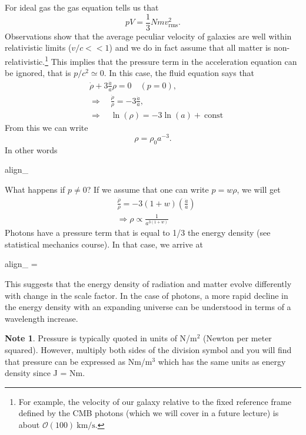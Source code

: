 \documentclass[a4paper,12pt]{article}
\newcommand{\boxedeq}[2]{\begin{empheq}[box={\fboxsep=6pt\fbox}]{align}\label{#1}#2\end{empheq}}
\theoremstyle{remark}
\newcommand{\mrm}[1]{\mathrm{#1}}
\renewcommand{\=}[1]{\stackrel{#1}{=}} %
\theoremstyle{plain}
\theoremstyle{definition}
\newtheorem*{definitionT}{Note}%
\newenvironment{note}{
\begin{dBox}
\begin{definitionT}}
{\end{definitionT}
\end{dBox}}
\begin{document}
For ideal gas the gas equation tells us that 
\begin{equation}
pV = \frac{1}{3}N m v^{2}_\mrm{rms}.
\end{equation}
Observations show that the average peculiar velocity of galaxies are well within relativistic limits ($v/c << 1$) and we do in fact assume that all matter is non-relativistic.\footnote{For example, the velocity of our galaxy relative to the fixed reference frame defined by the CMB photons (which we will cover in a future lecture) is about $\mathcal{O}(100) \:\mrm{km/s}$.} This implies that the pressure term in the acceleration equation can be ignored, that is $p/c^{2} \simeq 0$. In this case, the fluid equation says that
\begin{align}
&\dot{\rho} + 3 \frac{\dot{a}}{a}\rho = 0 \quad (p = 0), \nonumber \\
 &\Rightarrow \quad \frac{\dot{\rho}}{\rho} = -3 \frac{\dot{a}}{a}, \nonumber \\
 &\Rightarrow \quad \ln (\rho) = -3 \ln (a) + \:\mrm{const}
\end{align}
From this we can write
\begin{equation}
\rho = \rho _0 a^{-3}.
\label{eq:matter_rho_evolution}
\end{equation}
In other words
\boxedeq{eq:rhom}{\rho _\mrm{m} \propto {}}
%

What happens if $p \neq 0$? If we assume that one can write $p = w\rho$, we will get
\begin{align}
&\frac{\dot{\rho}}{\rho} = -3(1+w) \left( \frac{\dot{a}}{a} \right) \nonumber \\
&\Rightarrow \rho \propto \frac{1}{a^{3(1+w)}}
\end{align}
Photons have a pressure term that is equal to 1/3 the energy density (see statistical mechanics course). In that case, we arrive at 
\boxedeq{eq:rhor}{\rho _\mrm{r} \propto \frac{1}{a^{3(1+\frac{1}{3})}} = \frac{1}{a^{4}}}
This suggests that the energy density of radiation and matter evolve differently with change in the scale factor. In the case of photons, a more rapid decline in the energy density with an expanding universe can be understood in terms of a wavelength increase. 

\begin{note}
Pressure is typically quoted in units of N/m$^{2}$ (Newton per meter squared). However, multiply both sides of the division symbol and you will find that pressure can be expressed as Nm/m$^{3}$ which has the same units as energy density since J = Nm.
\end{note}
\end{document}
